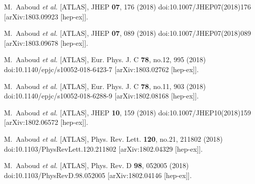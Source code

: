 \begin{thebibliography}{9}
M.~Aaboud \textit{et al.} [ATLAS],
JHEP \textbf{07}, 176 (2018)
doi:10.1007/JHEP07(2018)176
[arXiv:1803.09923 [hep-ex]].

M.~Aaboud \textit{et al.} [ATLAS],
JHEP \textbf{07}, 089 (2018)
doi:10.1007/JHEP07(2018)089
[arXiv:1803.09678 [hep-ex]].

M.~Aaboud \textit{et al.} [ATLAS],
Eur. Phys. J. C \textbf{78}, no.12, 995 (2018)
doi:10.1140/epjc/s10052-018-6423-7
[arXiv:1803.02762 [hep-ex]].

M.~Aaboud \textit{et al.} [ATLAS],
Eur. Phys. J. C \textbf{78}, no.11, 903 (2018)
doi:10.1140/epjc/s10052-018-6288-9
[arXiv:1802.08168 [hep-ex]].

M.~Aaboud \textit{et al.} [ATLAS],
JHEP \textbf{10}, 159 (2018)
doi:10.1007/JHEP10(2018)159
[arXiv:1802.06572 [hep-ex]].

M.~Aaboud \textit{et al.} [ATLAS],
Phys. Rev. Lett. \textbf{120}, no.21, 211802 (2018)
doi:10.1103/PhysRevLett.120.211802
[arXiv:1802.04329 [hep-ex]].

M.~Aaboud \textit{et al.} [ATLAS],
Phys. Rev. D \textbf{98}, 052005 (2018)
doi:10.1103/PhysRevD.98.052005
[arXiv:1802.04146 [hep-ex]].


\end{thebibliography}
